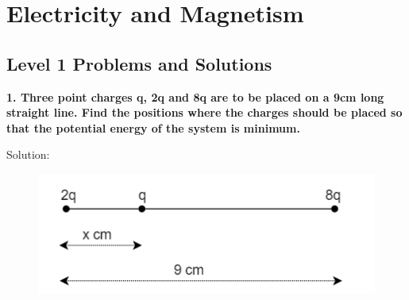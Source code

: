 \chapter{Electricity and Magnetism}

\pagestyle{fancy}
\fancyhf{}
\fancyhead[OC]{\leftmark}
\fancyhead[EC]{\rightmark}
\cfoot{\thepage}

\section{Level 1 Problems and Solutions}
\begin{tcolorbox}
\textbf{1. Three point charges q, 2q and 8q are to be placed on a 9cm long straight line. Find the positions where the charges should be placed so that the potential energy of the system is minimum.}
\end{tcolorbox}
Solution:
\begin{figure}[h]
    \centering
    \includegraphics[scale = 0.8]{figures/elecmag/threePtChar.png}
    \label{fig3}
\end{figure}

